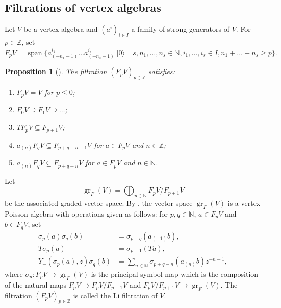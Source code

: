 \documentclass[a4paper, 12pt, reqno]{amsart}
\newtheorem{proposition}[theorem]{Proposition}
\theoremstyle{remark}
\numberwithin{equation}{subsection}
\DeclareMathOperator{\gr}{gr}
\DeclareMathOperator{\vspan}{span}
\DeclareMathOperator{\vac}{|0\rangle}
\begin{document}
\subsection{Filtrations of vertex algebras}
\label{sec:filtr-vert-algebr}

Let $V$ be a vertex algebra and $(a^i)_{i \in I}$ a family of strong generators of $V$.
For $p \in \mathbb{Z}$, set
\begin{equation*}
  F_pV = \vspan\{a^{i_1}_{(-n_1 - 1)}\dots a^{i_s}_{(-n_s - 1)}\vac \mid s, n_1, \dots, n_s \in \mathbb{N}, i_1, \dots, i_s \in I, n_1 + \dots + n_s \ge p\}.
\end{equation*}

\begin{proposition}[{\cite{li_abelianizing_2005}}]
  \label{prp:7}
  The filtration $(F_pV)_{p\in \mathbb{Z}}$ satisfies:
  \begin{enumerate}
  \item $F_pV = V$ for $p \le 0$;
  \item $F_0V \supseteq F_1V \supseteq \dots$;
  \item $TF_pV \subseteq F_{p + 1}V$;
  \item $a_{(n)}F_qV \subseteq F_{p + q - n - 1}V$ for $a \in F_pV$ and $n \in \mathbb{Z}$;
  \item $a_{(n)}F_qV \subseteq F_{p + q - n}V$ for $a \in F_pV$ and $n \in \mathbb{N}$.
  \end{enumerate}
\end{proposition}

Let
\begin{equation*}
  \gr_F(V) = \bigoplus_{p \in \mathbb{N}}F_pV/F_{p + 1}V
\end{equation*}
be the associated graded vector space.
By \cite{li_abelianizing_2005}, the vector space $\gr_F(V)$ is a vertex Poisson algebra with operations given as follows: for $p, q \in \mathbb{N}$, $a \in F_pV$ and $b \in F_qV$, set
\begin{align*}
  \sigma_p(a)\sigma_q(b) &= \sigma_{p + q}(a_{(-1)}b), \\
  T\sigma_p(a) &= \sigma_{p + 1}(Ta), \\
  Y_-(\sigma_p(a),z)\sigma_q(b) &= \sum_{n \in \mathbb{N}}\sigma_{p + q - n}(a_{(n)}b)z^{-n - 1},
\end{align*}
where $\sigma_p: F_pV \to \gr_F(V)$ is the principal symbol map which is the composition of the natural maps $F_pV \to F_pV/F_{p + 1}V$ and $F_pV/F_{p+1}V \to \gr_F(V)$.
The filtration $(F_pV)_{p \in \mathbb{Z}}$ is called the Li filtration of $V$.
\end{document}
